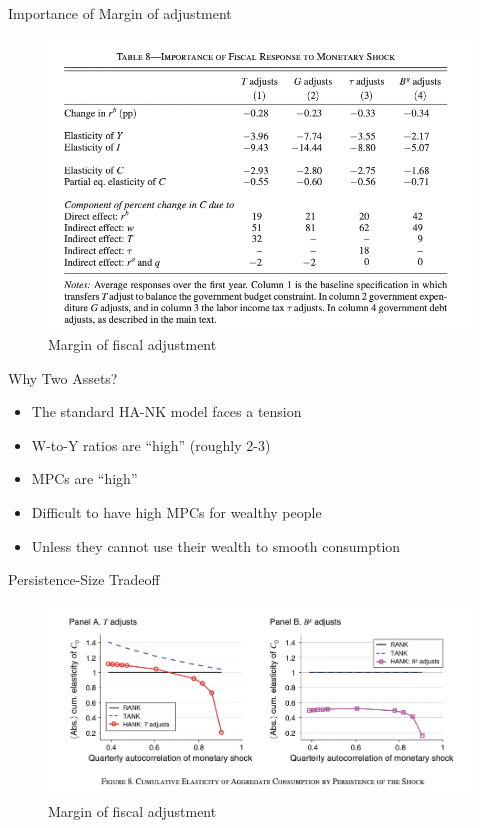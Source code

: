 \documentclass[english,xcolor=svgnames]{beamer}
\begin{document}
\begin{frame}{Importance of Margin of adjustment}
\begin{figure}
\includegraphics[scale=0.35]{figures/kmv_12}\\
Margin of fiscal adjustment
\end{figure}
\end{frame}

\begin{frame}{Why Two Assets?}
\begin{itemize}
\item The standard HA-NK model faces a tension
\item W-to-Y ratios are ``high'' (roughly 2-3)
\item MPCs are ``high''
\item Difficult to have high MPCs for wealthy people
\item Unless they cannot use their wealth to smooth consumption
\end{itemize}
\end{frame}


\begin{frame}{Persistence-Size Tradeoff}
\begin{figure}
\includegraphics[scale=0.35]{figures/kmv_13}\\
Margin of fiscal adjustment
\end{figure}
\end{frame}
\end{document}

